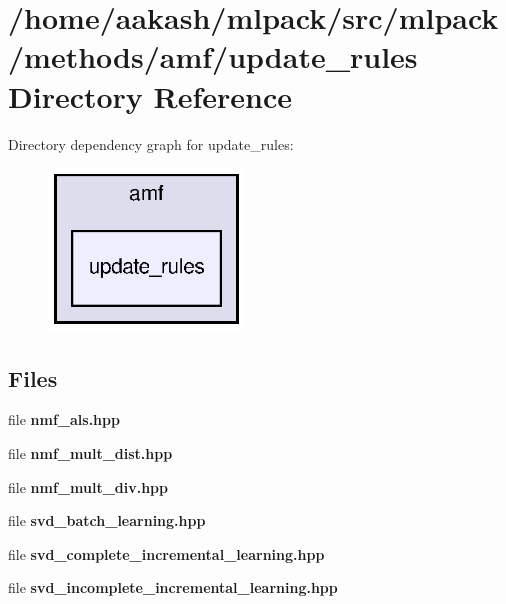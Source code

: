 \section{/home/aakash/mlpack/src/mlpack/methods/amf/update\+\_\+rules Directory Reference}
\label{dir_d2d4272c0c3066ecaa6136c65bce4822}
Directory dependency graph for update\+\_\+rules\+:
\nopagebreak
\begin{figure}[H]
\begin{center}
\leavevmode
\includegraphics[width=148pt]{dir_d2d4272c0c3066ecaa6136c65bce4822_dep}
\end{center}
\end{figure}
\subsection*{Files}
\begin{DoxyCompactItemize}
\item 
file \textbf{ nmf\+\_\+als.\+hpp}
\item 
file \textbf{ nmf\+\_\+mult\+\_\+dist.\+hpp}
\item 
file \textbf{ nmf\+\_\+mult\+\_\+div.\+hpp}
\item 
file \textbf{ svd\+\_\+batch\+\_\+learning.\+hpp}
\item 
file \textbf{ svd\+\_\+complete\+\_\+incremental\+\_\+learning.\+hpp}
\item 
file \textbf{ svd\+\_\+incomplete\+\_\+incremental\+\_\+learning.\+hpp}
\end{DoxyCompactItemize}
